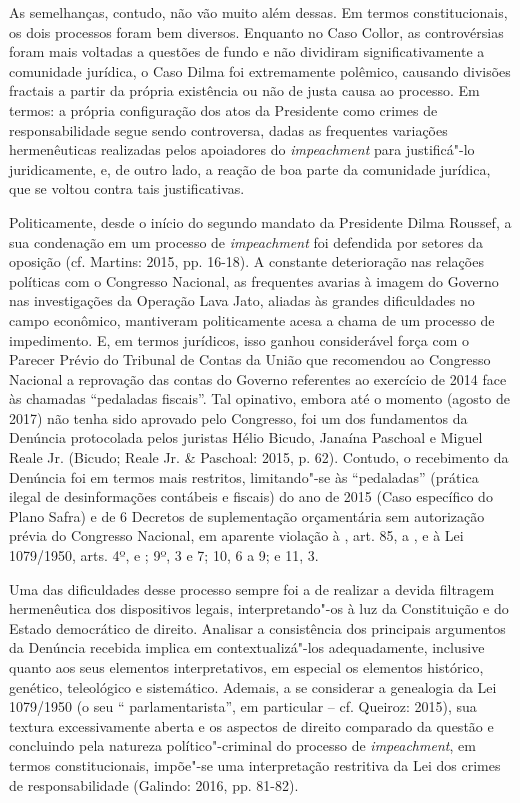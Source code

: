 As semelhanças, contudo, não vão muito além dessas. Em termos
constitucionais, os dois processos foram bem diversos. Enquanto no Caso
Collor, as controvérsias foram mais voltadas a questões de fundo e não
dividiram significativamente a comunidade jurídica, o Caso Dilma foi
extremamente polêmico, causando divisões fractais a partir da própria
existência ou não de justa causa ao processo. Em termos: a própria
configuração dos atos da Presidente como crimes de responsabilidade
segue sendo controversa, dadas as frequentes variações hermenêuticas
realizadas pelos apoiadores do \emph{impeachment} para justificá"-lo
juridicamente, e, de outro lado, a reação de boa parte da comunidade
jurídica, que se voltou contra tais justificativas.

Politicamente, desde o início do segundo mandato da Presidente Dilma
Roussef, a sua condenação em um processo de \emph{impeachment} foi
defendida por setores da oposição (cf. Martins: 2015, pp. 16-18). A
constante deterioração nas relações políticas com o Congresso Nacional,
as frequentes avarias à imagem do Governo nas investigações da Operação
Lava Jato, aliadas às grandes dificuldades no campo econômico,
mantiveram politicamente acesa a chama de um processo de impedimento. E,
em termos jurídicos, isso ganhou considerável força com o Parecer Prévio
do Tribunal de Contas da União que recomendou ao Congresso Nacional a
reprovação das contas do Governo referentes ao exercício de 2014 face às
chamadas ``pedaladas fiscais''. Tal opinativo, embora até o momento
(agosto de 2017) não tenha sido aprovado pelo Congresso, foi um dos
fundamentos da Denúncia protocolada pelos juristas Hélio Bicudo, Janaína
Paschoal e Miguel Reale Jr. (Bicudo; Reale Jr. \& Paschoal: 2015, p.
62). Contudo, o recebimento da Denúncia foi em termos mais restritos,
limitando"-se às ``pedaladas'' (prática ilegal de desinformações
contábeis e fiscais) do ano de 2015 (Caso específico do Plano Safra) e
de 6 Decretos de suplementação orçamentária sem autorização prévia do
Congresso Nacional, em aparente violação à , art. 85,  a , e à Lei
1079/1950, arts. 4º,  e ; 9º, 3 e 7; 10, 6 a 9; e 11, 3.

Uma das dificuldades desse processo sempre foi a de realizar a devida
filtragem hermenêutica dos dispositivos legais, interpretando"-os à luz
da Constituição e do Estado democrático de direito. Analisar a
consistência dos principais argumentos da Denúncia recebida implica em
contextualizá"-los adequadamente, inclusive quanto aos seus elementos
interpretativos, em especial os elementos histórico, genético,
teleológico e sistemático. Ademais, a se considerar a genealogia da Lei
1079/1950 (o seu `` parlamentarista'', em particular -- cf. Queiroz:
2015), sua textura excessivamente aberta e os aspectos de direito
comparado da questão e concluindo pela natureza político"-criminal do
processo de \emph{impeachment}, em termos constitucionais, impõe"-se uma
interpretação restritiva da Lei dos crimes de responsabilidade (Galindo:
2016, pp. 81-82).

